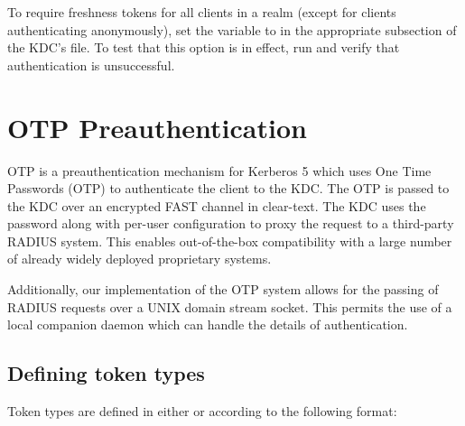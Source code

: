 \documentclass[letterpaper,10pt,english]{sphinxmanual}
\begin{document}
To require freshness tokens for all clients in a realm (except for
clients authenticating anonymously), set the
 variable to  in the appropriate
{\hyperref[\detokenize{admin/conf_files/kdc_conf:kdc-realms}]{}} subsection of the KDC’s {\hyperref[\detokenize{admin/conf_files/kdc_conf:kdc-conf-5}]{}} file.  To
test that this option is in effect, run 
and verify that authentication is unsuccessful.


\chapter{OTP Preauthentication}
\label{\detokenize{admin/otp::doc}}\label{\detokenize{admin/otp:otp-preauthentication}}\label{\detokenize{admin/otp:otp-preauth}}
OTP is a preauthentication mechanism for Kerberos 5 which uses One
Time Passwords (OTP) to authenticate the client to the KDC.  The OTP
is passed to the KDC over an encrypted FAST channel in clear-text.
The KDC uses the password along with per-user configuration to proxy
the request to a third-party RADIUS system.  This enables
out-of-the-box compatibility with a large number of already widely
deployed proprietary systems.

Additionally, our implementation of the OTP system allows for the
passing of RADIUS requests over a UNIX domain stream socket.  This
permits the use of a local companion daemon which can handle the
details of authentication.


\section{Defining token types}
\label{\detokenize{admin/otp:defining-token-types}}
Token types are defined in either {\hyperref[\detokenize{admin/conf_files/krb5_conf:krb5-conf-5}]{}} or
{\hyperref[\detokenize{admin/conf_files/kdc_conf:kdc-conf-5}]{}} according to the following format:
\end{document}
